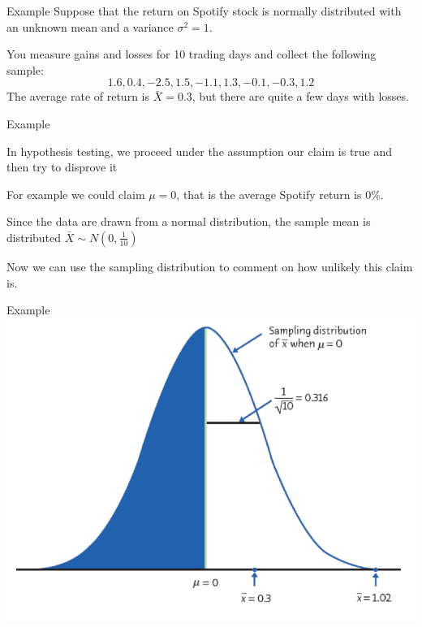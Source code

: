 \documentclass{beamer}
\begin{document}
\begin{frame}{Example}
	Suppose that the return on Spotify stock is normally distributed with an unknown mean and a variance $\sigma^2=1$. 
	
	You measure gains and losses for 10 trading days and collect the following sample:
	$$1.6, 0.4, -2.5, 1.5, -1.1, 1.3, -0.1, -0.3, 1.2$$
	The average rate of return is $\bar{X}=0.3$, but there are quite a few days with losses.
\end{frame}

\begin{frame}{Example}
	
	In hypothesis testing, we proceed under the assumption our claim is true and then try to disprove it
	
	For example we could claim $\mu=0$, that is the average Spotify return is 0\%.
	
	Since the data are drawn from a normal distribution, the sample mean is distributed $\bar{X} \sim N(0, \frac{1}{10})$
	
	Now we can use the sampling distribution to comment on how unlikely this claim is. 
	
\end{frame}

\begin{frame}{Example}
	\includegraphics[width=\textwidth]{nullhypothesisdistn}
\end{frame}
\end{document}
